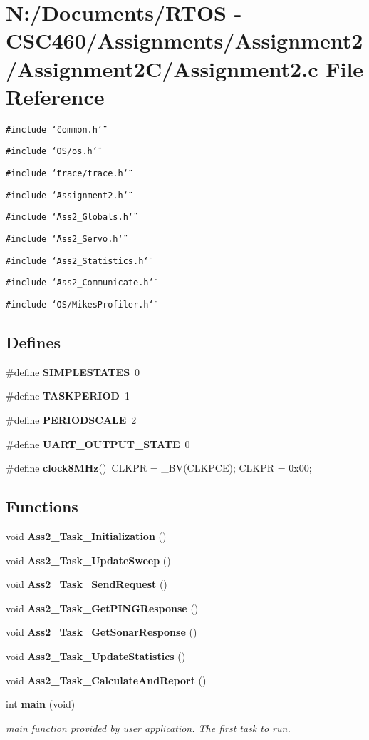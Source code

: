 \section{N:/Documents/RTOS - CSC460/Assignments/Assignment2/Assignment2C/Assignment2.c File Reference}
\label{_assignment2_8c}
{\tt \#include \char`\"{}common.h\char`\"{}}\par
{\tt \#include \char`\"{}OS/os.h\char`\"{}}\par
{\tt \#include \char`\"{}trace/trace.h\char`\"{}}\par
{\tt \#include \char`\"{}Assignment2.h\char`\"{}}\par
{\tt \#include \char`\"{}Ass2\_\-Globals.h\char`\"{}}\par
{\tt \#include \char`\"{}Ass2\_\-Servo.h\char`\"{}}\par
{\tt \#include \char`\"{}Ass2\_\-Statistics.h\char`\"{}}\par
{\tt \#include \char`\"{}Ass2\_\-Communicate.h\char`\"{}}\par
{\tt \#include \char`\"{}OS/Mikes\-Profiler.h\char`\"{}}\par
\subsection*{Defines}
\begin{CompactItemize}
\item 
\#define {\bf SIMPLESTATES}~0
\item 
\#define {\bf TASKPERIOD}~1
\item 
\#define {\bf PERIODSCALE}~2
\item 
\#define {\bf UART\_\-OUTPUT\_\-STATE}~0
\item 
\#define {\bf clock8MHz}()~CLKPR = \_\-BV(CLKPCE); CLKPR = 0x00;
\end{CompactItemize}
\subsection*{Functions}
\begin{CompactItemize}
\item 
void {\bf Ass2\_\-Task\_\-Initialization} ()
\item 
void {\bf Ass2\_\-Task\_\-Update\-Sweep} ()
\item 
void {\bf Ass2\_\-Task\_\-Send\-Request} ()
\item 
void {\bf Ass2\_\-Task\_\-Get\-PINGResponse} ()
\item 
void {\bf Ass2\_\-Task\_\-Get\-Sonar\-Response} ()
\item 
void {\bf Ass2\_\-Task\_\-Update\-Statistics} ()
\item 
void {\bf Ass2\_\-Task\_\-Calculate\-And\-Report} ()
\item 
int {\bf main} (void)
\begin{CompactList}\small\item\em main function provided by user application. The first task to run. \item\end{CompactList}\end{CompactItemize}
